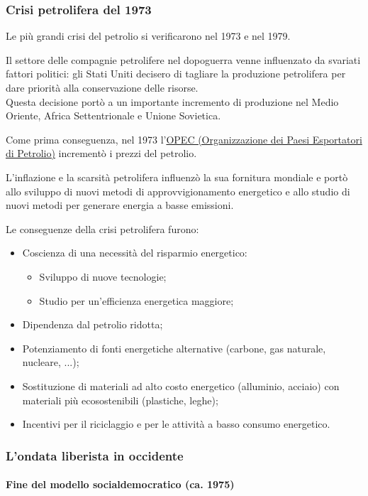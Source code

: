 \documentclass{article}
\begin{document}
\subsubsection{Crisi petrolifera del 1973}
Le più grandi crisi del petrolio si verificarono nel 1973 e nel 1979.

Il settore delle compagnie petrolifere nel dopoguerra venne influenzato da svariati fattori
politici: gli Stati Uniti decisero di tagliare la produzione petrolifera per dare priorità
alla conservazione delle risorse.\\
Questa decisione portò a un importante incremento di produzione nel Medio Oriente, Africa
Settentrionale e Unione Sovietica.

Come prima conseguenza, nel 1973 l'\underline{OPEC (Organizzazione dei Paesi Esportatori di Petrolio)}
incrementò i prezzi del petrolio. 

L'inflazione e la scarsità petrolifera influenzò la sua fornitura mondiale e portò allo
sviluppo di nuovi metodi di approvvigionamento energetico e allo studio di nuovi metodi per
generare energia a basse emissioni.

Le conseguenze della crisi petrolifera furono:
\begin{itemize}
    \item Coscienza di una necessità del risparmio energetico:
    \begin{itemize}
        \item Sviluppo di nuove tecnologie;
        \item Studio per un'efficienza energetica maggiore;
    \end{itemize}
    \item Dipendenza dal petrolio ridotta;
    \item Potenziamento di fonti energetiche alternative (carbone, gas naturale, nucleare, ...);
    \item Sostituzione di materiali ad alto costo energetico (alluminio, acciaio) con materiali
        più ecosostenibili (plastiche, leghe);
    \item Incentivi per il riciclaggio e per le attività a basso consumo energetico.
\end{itemize}

\subsubsection{L'ondata liberista in occidente}
\paragraph*{Fine del modello socialdemocratico (ca. 1975)} \phantom{}
\end{document}
